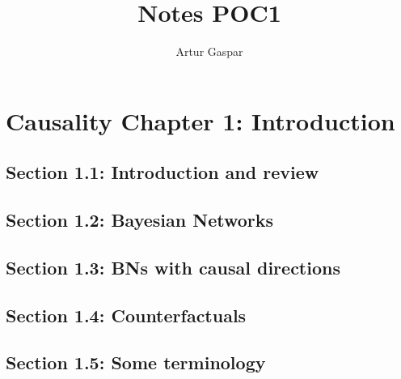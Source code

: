 \documentclass[oneside]{book}
\title{Notes POC1}
\author{Artur Gaspar}
\begin{document}
\maketitle
\tableofcontents

\chapter{Causality Chapter 1: Introduction}

\section{Section 1.1: Introduction and review}



\section{Section 1.2: Bayesian Networks}



\section{Section 1.3: BNs with causal directions}



\section{Section 1.4: Counterfactuals}



\section{Section 1.5: Some terminology}


\end{document}

